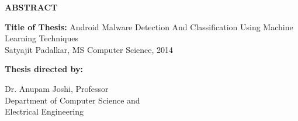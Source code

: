 \newpage
\pagestyle{empty}

\begin{center}
\vspace{0.1in}
\large{\bf ABSTRACT} \par  
\bigskip \bigskip
\end{center}

\begin{flushleft}
{\bf Title of Thesis:} {Android Malware Detection And Classification Using Machine Learning Techniques\\
Satyajit Padalkar, MS Computer Science, 2014\\}
\begin{singlespace}
{\bf Thesis directed by:}{\hspace{2.5mm}} \parbox[t]{3in}{Dr. Anupam Joshi, Professor \\
Department of Computer Science and \\ Electrical Engineering}
\end{singlespace}
\end{flushleft}

